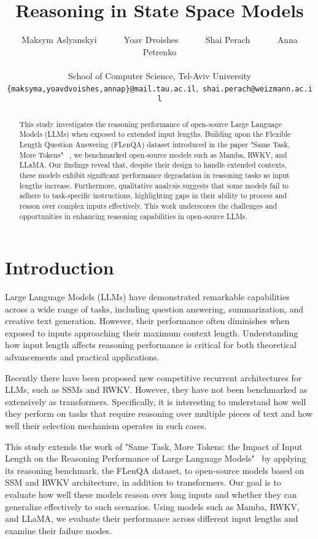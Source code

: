 \documentclass[11pt]{article}
\title{Reasoning in State Space Models}
\author{Maksym Aslyanskyi ~~~~~
  Yoav Dvoishes ~~~~~
  Shai Perach ~~~~~
  Anna Petrenko \\
  \mbox{}\\
  School of Computer Science, Tel-Aviv University \\
  \small{\texttt{\{maksyma,yoavdvoishes,annap\}@mail.tau.ac.il},~\texttt{shai.perach@weizmann.ac.il}}}
\begin{document}
\maketitle
\begin{abstract}
This study investigates the reasoning performance of open-source Large Language Models (LLMs) when exposed to extended input lengths. Building upon the Flexible Length Question Answering (FLenQA) dataset introduced in the paper "Same Task, More Tokens" ~\citep{levy-etal-2024-task}, we benchmarked open-source models such as Mamba, RWKV, and LLaMA. Our findings reveal that, despite their design to handle extended contexts, these models exhibit significant performance degradation in reasoning tasks as input lengths increase. Furthermore, qualitative analysis suggests that some models fail to adhere to task-specific instructions, highlighting gaps in their ability to process and reason over complex inputs effectively. This work underscores the challenges and opportunities in enhancing reasoning capabilities in open-source LLMs.
\end{abstract}

\section{Introduction}

Large Language Models (LLMs) have demonstrated remarkable capabilities across a wide range of tasks, including question answering, summarization, and creative text generation. However, their performance often diminishes when exposed to inputs approaching their maximum context length. Understanding how input length affects reasoning performance is critical for both theoretical advancements and practical applications.

Recently there have been proposed new competitive recurrent architectures for LLMs,
such as SSMs and RWKV. However, they have not been benchmarked as extensively as transformers.
Specifically, it is interesting to understand how well they perform on tasks that require reasoning over
multiple pieces of text and how well their selection mechanism operates in such cases.

This study extends the work of "Same Task, More Tokens: the Impact of Input Length on the Reasoning Performance of Large Language Models"~\citep{levy-etal-2024-task} by applying its reasoning benchmark, the FLenQA dataset, to open-source models based on SSM and RWKV architecture, in addition to transformers. Our goal is to evaluate how well these models reason over long inputs and whether they can generalize effectively to such scenarios. Using models such as Mamba, RWKV, and LLaMA, we evaluate their performance across different input lengths and examine their failure modes. 
\end{document}
